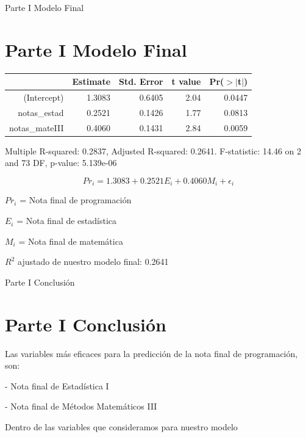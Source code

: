 \documentclass[pdf]{beamer}
\begin{document}
\begin{frame}{Parte I Modelo Final}
\section{Parte I Modelo Final}

\begin{center}
\begin{table}[ht]
\begin{center}
\begin{tabular}{rrrrr}
  \hline
 & Estimate & Std. Error & t value & Pr($>$$|$t$|$) \\ 
  \hline
(Intercept) & 1.3083 & 0.6405 & 2.04 & 0.0447 \\ 
  notas\_estad & 0.2521 & 0.1426 & 1.77 & 0.0813 \\ 
  notas\_mateIII & 0.4060 & 0.1431 & 2.84 & 0.0059 \\ 
   \hline
\end{tabular}
\end{center}
\end{table}

\tiny{Multiple R-squared: 0.2837, Adjusted R-squared: 0.2641.
F-statistic: 14.46 on 2 and 73 DF, p-value: 5.139e-06}
\end{center}

\begin{center}

\[Pr_i = 1.3083 + 0.2521 E_i + 0.4060 M_i + \epsilon_i\]
\end{center}

\(Pr_i\) = Nota final de programación

\(E_i\) = Nota final de estadística

\(M_i\) = Nota final de matemática

\(R^2\) ajustado de nuestro modelo final: 0.2641

\end{frame}
\begin{frame}{Parte I Conclusión}
\section{Parte I Conclusión}
 \begin{footnotesize}
            
            Las variables más eficaces para la predicción de la nota final de programación, son:

            - Nota final de Estadística I
            
            - Nota final de Métodos Matemáticos III

            Dentro de las variables que consideramos para nuestro modelo
            
            

            \end{footnotesize}
            \nocite{comuna}
            \nocite{estrescovid}

\end{frame}
\end{document}

